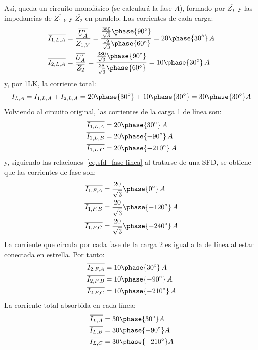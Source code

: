 \begin{example}
		Así, queda un circuito monofásico (se calculará la fase $A$), formado por $\overline{Z_L}$ y las impedancias de $\overline{Z_{1,Y}}$ y $\overline{Z_2}$ en paralelo. Las corrientes de cada carga:
		\begin{align*}
		    \overline{I_{1,L,A}}&=\dfrac{\overline{U_A'}}{\overline{Z_{1,Y}}}=\dfrac{\frac{380}{\sqrt{3}}\phase{90^\circ}}{\frac{19}{\sqrt{3}}\phase{60^\circ}}=20\phase{30^\circ}\,A\\
		    \overline{I_{2,L,A}}&=\dfrac{\overline{U_A'}}{\overline{Z_{2}}}=\dfrac{\frac{380}{\sqrt{3}}\phase{90^\circ}}{\frac{38}{\sqrt{3}}\phase{60^\circ}}=10\phase{30^\circ}\,A
		\end{align*}
		y, por 1LK, la corriente total:
		\begin{equation*}
		    \overline{I_{L,A}}=\overline{I_{1,L,A}}+\overline{I_{2,L,A}}=20\phase{30^\circ}+10\phase{30^\circ}=30\phase{30^\circ} A
		\end{equation*}
		Volviendo al circuito original, las corrientes de la carga 1 de línea son:
		\begin{align*}
		    \overline{I_{1,L,A}}&=20\phase{30^\circ}\,A\\
		    \overline{I_{1,L,B}}&=20\phase{-90^\circ}\,A\\
		    \overline{I_{1,L,C}}&=20\phase{-210^\circ}\,A\\
		\end{align*}
		y, siguiendo las relaciones~\eqref{eq.sfd_fase-linea} al tratarse de una SFD, se obtiene que las corrientes de fase son: 
		\begin{align*}
		    \overline{I_{1,F,A}}&=\dfrac{20}{\sqrt{3}}\phase{0^\circ}\,A\\
		    \overline{I_{1,F,B}}&=\dfrac{20}{\sqrt{3}}\phase{-120^\circ}\,A\\
		    \overline{I_{1,F,C}}&=\dfrac{20}{\sqrt{3}}\phase{-240^\circ}\,A\\
		\end{align*}
		La corriente que circula por cada fase de la carga 2 es igual a la de línea al estar conectada en estrella. Por tanto:
		\begin{align*}
		    \overline{I_{2,F,A}}&=10\phase{30^\circ}\,A\\
		    \overline{I_{2,F,B}}&=10\phase{-90^\circ}\,A\\
		    \overline{I_{2,F,C}}&=10\phase{-210^\circ}\,A
		\end{align*}
		La corriente total absorbida en cada línea:
		\begin{align*}
		    \overline{I_{L,A}}&=30\phase{30^\circ} A\\
		    \overline{I_{L,B}}&=30\phase{-90^\circ} A\\
		    \overline{I_{L,C}}&=30\phase{-210^\circ} A\\
		\end{align*}
		

\end{example}
